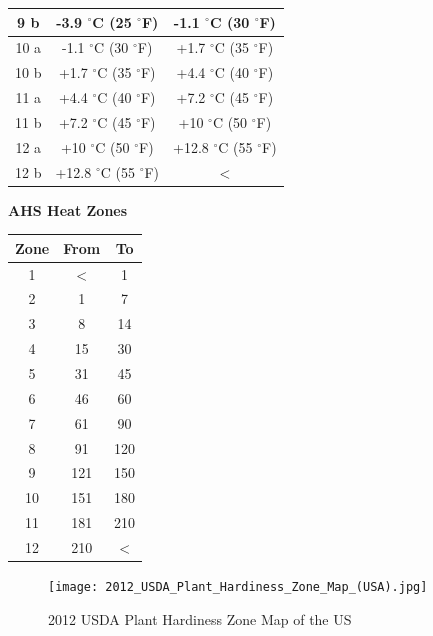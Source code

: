 \documentclass[10pt]{extarticle}
\begin{document}
\begin{center}
\begin{tabular}{|c|c|c|}
\hline 
9 b &	-3.9 $^{\circ}$C (25 $^{\circ}$F) &	-1.1 $^{\circ}$C (30 $^{\circ}$F)
\\
\hline 
10 a &	-1.1 $^{\circ}$C (30 $^{\circ}$F) &	+1.7 $^{\circ}$C (35 $^{\circ}$F)
\\
\hline 
10 b &	+1.7 $^{\circ}$C (35 $^{\circ}$F) &	+4.4 $^{\circ}$C (40 $^{\circ}$F)
\\
\hline 
11 a &	+4.4 $^{\circ}$C (40 $^{\circ}$F) &	+7.2 $^{\circ}$C (45 $^{\circ}$F)
\\
\hline 
11 b &	+7.2 $^{\circ}$C (45 $^{\circ}$F) &	+10 $^{\circ}$C (50 $^{\circ}$F)
\\
\hline 
12 a &	+10 $^{\circ}$C (50 $^{\circ}$F) & +12.8 $^{\circ}$C (55 $^{\circ}$F)
\\
\hline 
12 b &  +12.8 $^{\circ}$C (55 $^{\circ}$F)  & $<$ \\
\hline 
\end{tabular}
\end{center}
\begin{center}
\textbf{AHS Heat Zones} \\
\begin{tabular}{|c|c|c|}
	\hline
	Zone &	From &	To
\\
	\hline
	1 & $<$ &  1
\\
	\hline
	2 &	1 &	7
\\
	\hline
	3 &	8 &	14
\\
	\hline
	4 &	15 & 30
\\
	\hline
	5 &	31 & 45
\\
	\hline
	6 &	46 & 60
\\
	\hline
	7 &	61 & 90
\\
	\hline
	8 &	91 & 120
\\
	\hline
	9 &	121 & 150 \\
	\hline
	10 & 151 & 180
\\
	\hline
	11 & 181 & 210
\\
	\hline
	12 & 210 & $<$ \\
	\hline
\end{tabular}
\end{center}

\begin{figure}
	\texttt{[image: 2012\_USDA\_Plant\_Hardiness\_Zone\_Map\_(USA).jpg]}
	\caption{2012 USDA Plant Hardiness Zone Map of the US}
	\label{fig:PlantHardinessZoneMapoftheUS}
\end{figure}
\end{document}
